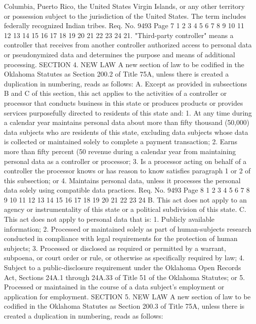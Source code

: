 Columbia, Puerto Rico, the United States Virgin Islands, or any
other territory or possession subject to the jurisdiction of the
United States. The term includes federally recognized Indian tribes.
Req. No. 9493 Page 7
1
2
3
4
5
6
7
8
9
10
11
12
13
14
15
16
17
18
19
20
21
22
23
24
21. "Third-party controller" means a controller that receives
from another controller authorized access to personal data or
pseudonymized data and determines the purpose and means of
additional processing.
SECTION 4. NEW LAW A new section of law to be codified
in the Oklahoma Statutes as Section 200.2 of Title 75A, unless there
is created a duplication in numbering, reads as follows:
A. Except as provided in subsections B and C of this section,
this act applies to the activities of a controller or processor that
conducts business in this state or produces products or provides
services purposefully directed to residents of this state and:
1. At any time during a calendar year maintains personal data
about more than fifty thousand (50,000) data subjects who are
residents of this state, excluding data subjects whose data is
collected or maintained solely to complete a payment transaction;
2. Earns more than fifty percent (50%
revenue during a calendar year from maintaining personal data as a
controller or processor;
3. Is a processor acting on behalf of a controller the
processor knows or has reason to know satisfies paragraph 1 or 2 of
this subsection; or
4. Maintains personal data, unless it processes the personal
data solely using compatible data practices.
Req. No. 9493 Page 8
1
2
3
4
5
6
7
8
9
10
11
12
13
14
15
16
17
18
19
20
21
22
23
24
B. This act does not apply to an agency or instrumentality of
this state or a political subdivision of this state.
C. This act does not apply to personal data that is:
1. Publicly available information;
2. Processed or maintained solely as part of human-subjects
research conducted in compliance with legal requirements for the
protection of human subjects;
3. Processed or disclosed as required or permitted by a warrant,
subpoena, or court order or rule, or otherwise as specifically required
by law;
4. Subject to a public-disclosure requirement under the
Oklahoma Open Records Act, Sections 24A.1 through 24A.33 of Title 51
of the Oklahoma Statutes; or
5. Processed or maintained in the course of a data subject's
employment or application for employment.
SECTION 5. NEW LAW A new section of law to be codified
in the Oklahoma Statutes as Section 200.3 of Title 75A, unless there
is created a duplication in numbering, reads as follows:
